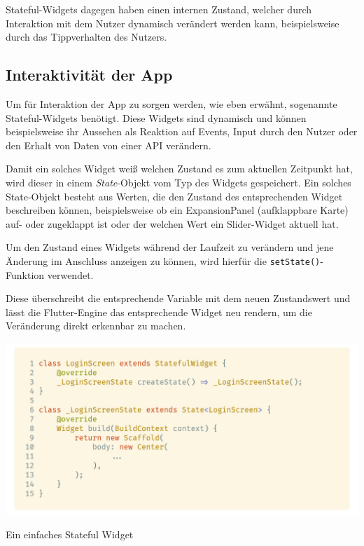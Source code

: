 Stateful-Widgets dagegen haben einen internen Zustand, welcher durch Interaktion mit dem Nutzer dynamisch verändert
werden kann, beispielsweise durch das Tippverhalten des Nutzers.

\subsection{Interaktivität der App}


Um für Interaktion der App zu sorgen werden, wie eben erwähnt, sogenannte Stateful-Widgets benötigt. Diese Widgets sind dynamisch und können beispielsweise ihr Aussehen als Reaktion auf Events, Input durch den Nutzer oder den Erhalt von Daten von einer API verändern.

Damit ein solches Widget weiß welchen Zustand es zum aktuellen Zeitpunkt hat, wird dieser in einem \textit{State}-Objekt vom Typ
des Widgets gespeichert. Ein solches State-Objekt besteht aus Werten, die den Zustand des entsprechenden Widget beschreiben können, beispielsweise ob ein ExpansionPanel (aufklappbare Karte) auf- oder zugeklappt ist oder der welchen Wert ein Slider-Widget aktuell hat.

Um den Zustand eines Widgets während der Laufzeit zu verändern und jene Änderung im Anschluss anzeigen zu können, wird hierfür die \lstinline{setState()}-Funktion verwendet.

Diese überschreibt die entsprechende Variable mit dem neuen Zustandswert und lässt die Flutter-Engine das entsprechende
Widget neu rendern, um die Veränderung direkt erkennbar zu machen.

\begin{code}
    \centering
    \includegraphics[width=1\textwidth]{images/Flutter/flutterStatefulWidget.png}
    \caption{Ein einfaches Stateful Widget}
\end{code}

